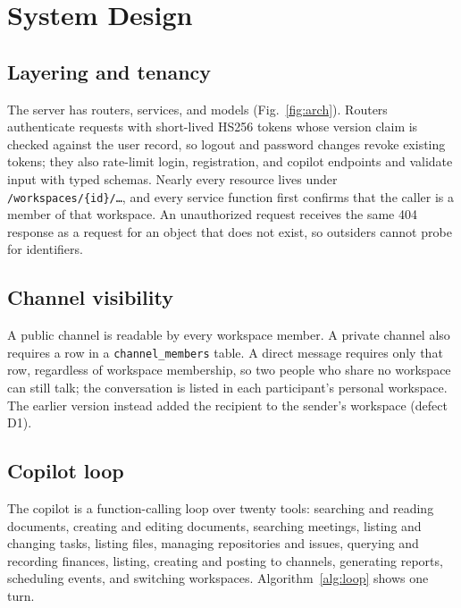 \documentclass[conference]{IEEEtran}
\begin{document}
\section{System Design}
\label{sec:design}



\subsection{Layering and tenancy}
The server has routers, services, and models (Fig.~\ref{fig:arch}). Routers authenticate requests with short-lived HS256 tokens whose version claim is checked against the user record, so logout and password changes revoke existing tokens; they also rate-limit login, registration, and copilot endpoints and validate input with typed schemas. Nearly every resource lives under \texttt{/workspaces/\{id\}/\dots}, and every service function first confirms that the caller is a member of that workspace. An unauthorized request receives the same 404 response as a request for an object that does not exist, so outsiders cannot probe for identifiers.

\subsection{Channel visibility}
A public channel is readable by every workspace member. A private channel also requires a row in a \texttt{channel\_members} table. A direct message requires only that row, regardless of workspace membership, so two people who share no workspace can still talk; the conversation is listed in each participant's personal workspace. The earlier version instead added the recipient to the sender's workspace (defect D1).

\subsection{Copilot loop}
The copilot is a function-calling loop over twenty tools: searching and reading documents, creating and editing documents, searching meetings, listing and changing tasks, listing files, managing repositories and issues, querying and recording finances, listing, creating and posting to channels, generating reports, scheduling events, and switching workspaces. Algorithm~\ref{alg:loop} shows one turn.
\end{document}
